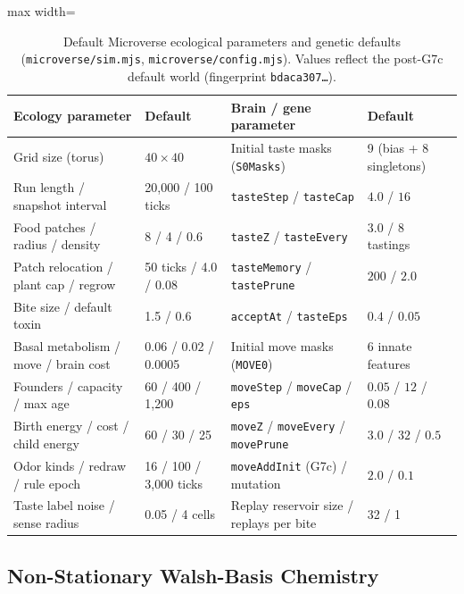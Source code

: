 \begin{table}[t]
\centering
\caption{Default Microverse ecological parameters and genetic defaults (\texttt{microverse/sim.mjs}, \texttt{microverse/config.mjs}). Values reflect the post-G7c default world (fingerprint \texttt{bdaca307\dots}).}
\label{tab:world-params}
\small
\begin{adjustbox}{max width=\textwidth}
\begin{tabular}{@{}llll@{}}
\toprule
\textbf{Ecology parameter} & \textbf{Default} & \textbf{Brain / gene parameter} & \textbf{Default} \\
\midrule
Grid size (torus) & $40 \times 40$ & Initial taste masks (\texttt{S0Masks}) & 9 (bias + 8 singletons) \\
Run length / snapshot interval & 20,000 / 100 ticks & \texttt{tasteStep} / \texttt{tasteCap} & $4.0$ / $16$ \\
Food patches / radius / density & 8 / 4 / 0.6 & \texttt{tasteZ} / \texttt{tasteEvery} & $3.0$ / $8$ tastings \\
Patch relocation / plant cap / regrow & 50 ticks / 4.0 / 0.08 & \texttt{tasteMemory} / \texttt{tastePrune} & $200$ / $2.0$ \\
Bite size / default toxin & 1.5 / 0.6 & \texttt{acceptAt} / \texttt{tasteEps} & $0.4$ / $0.05$ \\
Basal metabolism / move / brain cost & 0.06 / 0.02 / 0.0005 & Initial move masks (\texttt{MOVE0}) & 6 innate features \\
Founders / capacity / max age & 60 / 400 / 1,200 & \texttt{moveStep} / \texttt{moveCap} / \texttt{eps} & $0.05$ / $12$ / $0.08$ \\
Birth energy / cost / child energy & 60 / 30 / 25 & \texttt{moveZ} / \texttt{moveEvery} / \texttt{movePrune} & $3.0$ / $32$ / $0.5$ \\
Odor kinds / redraw / rule epoch & 16 / 100 / 3,000 ticks & \texttt{moveAddInit} (G7c) / mutation & $2.0$ / $0.1$ \\
Taste label noise / sense radius & 0.05 / 4 cells & Replay reservoir size / replays per bite & 32 / 1 \\
\bottomrule
\end{tabular}
\end{adjustbox}
\end{table}

\subsection{Non-Stationary Walsh-Basis Chemistry}


